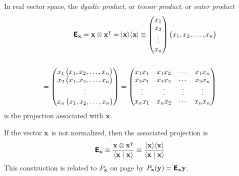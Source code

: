 In real vector space, the {\em dyadic product}, or {\em tensor product}, or {\em outer product}
\begin{equation}
\begin{split}
\textsf{\textbf{E}}_{\bf x} = {\bf x} \otimes {\bf x}^\intercal  = \vert{\bf x}\rangle \langle {\bf x}\vert
\equiv
\begin{pmatrix}
x_1\\
x_2\\
\vdots \\
x_n
\end{pmatrix}
\begin{pmatrix}x_1,x_2,\ldots ,x_n\end{pmatrix}\\
\\
=
\begin{pmatrix}
x_1\begin{pmatrix}x_1,x_2,\ldots ,x_n\end{pmatrix}\\
x_2\begin{pmatrix}x_1,x_2,\ldots ,x_n\end{pmatrix}\\
\vdots  \\
x_n\begin{pmatrix}x_1,x_2,\ldots ,x_n \end{pmatrix}
\end{pmatrix}
=
\begin{pmatrix}
x_1x_1&x_1x_2& \cdots&x_1x_n\\
x_2x_1&x_2x_2& \cdots&x_2x_n\\
\vdots & \vdots & \vdots &\vdots \\
x_nx_1&x_nx_2& \cdots&x_nx_n
\end{pmatrix}
\end{split}
\end{equation}
is the projection
associated with ${\bf x}$.

If the vector ${\bf x}$ is not normalized,
then the associated projection is
\begin{equation}
\textsf{\textbf{E}}_{\bf x} \equiv \frac{{\bf x} \otimes {\bf x}^\intercal }{\langle {\bf x}\mid {\bf x}\rangle}
\equiv \frac{\vert{\bf x}\rangle \langle {\bf x}\vert}{\langle {\bf x}\mid {\bf x}\rangle}
\end{equation}
This construction is related to
$P_{\bf x}$ on page \pageref{2011-m-gsp}
by $P_{\bf x}({\bf y})=\textsf{\textbf{E}}_{\bf x}{\bf y}$.

